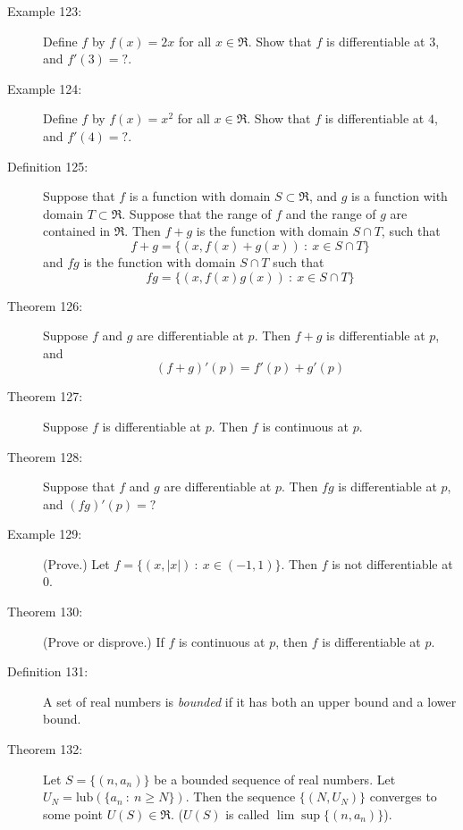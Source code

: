 \documentclass{article}
\begin{document}
\begin{description}
  \item[Example 123:] Define $f$ by $f(x) = 2x$ for all $x \in \Re$. Show that $f$ is differentiable at $3$, and $f'(3) = ?$. 

  \item[Example 124:] Define $f$ by $f(x) = x^{2}$ for all $x \in \Re$. Show that $f$ is differentiable at $4$, and $f'(4) = ?$. 

  \item[Definition 125:] Suppose that $f$ is a function with domain $S \subset \Re$, and $g$ is a function with domain $T \subset \Re$. Suppose that the range of $f$ and the range of $g$ are contained in $\Re$. Then $f+g$ is the function with domain $S \cap T$, such that
    \begin{equation*}
    f+g = \{ (x, f(x)+g(x) )\ :\ x \in S \cap T \}
    \end{equation*}
    and $fg$ is the function with domain $S \cap T$ such that
    \begin{equation*}
    fg = \{ (x, f(x) g(x) )\ :\ x \in S \cap T \}
    \end{equation*}

  \item[Theorem 126:] Suppose $f$ and $g$ are differentiable at $p$. Then $f+g$ is differentiable at $p$, and
    \begin{equation*}
    (f+g)' (p) = f' (p) + g' (p)
    \end{equation*}

  \item[Theorem 127:] Suppose $f$ is differentiable at $p$. Then $f$ is continuous at $p$. 

  \item[Theorem 128:] Suppose that $f$ and $g$ are differentiable at $p$. Then $fg$ is differentiable at $p$, and $(fg)' (p) = ?$

  \item[Example 129:] (Prove.) Let $f = \{ (x, |x|)\ :\ x \in (-1,1) \}$. Then $f$ is not differentiable at $0$. 

  \item[Theorem 130:] (Prove or disprove.) If $f$ is continuous at $p$, then $f$ is differentiable at $p$.

  \item[Definition 131:] A set of real numbers is \emph{bounded} if it has both an upper bound and a lower bound.

  \item[Theorem 132:] Let $S = \{ (n, a_{n}) \}$ be a bounded sequence of real numbers. Let $U_{N} = \text{lub} ( \{ a_{n}\ :\ n \geq N\} )$. Then the sequence $\{ (N, U_{N}) \}$ converges to some point $U(S) \in \Re$. ($U(S)$ is called $\lim \sup \{ (n, a_{n}) \}$). 


\end{description}
\end{document}
